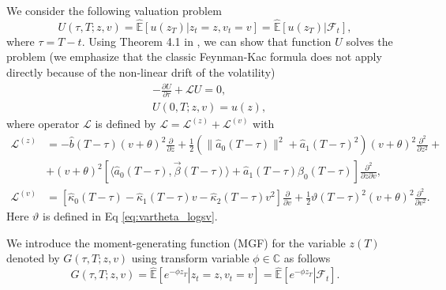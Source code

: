 \documentclass[pdftex,11pt,a4paper] {article}
\begin{document}
We consider the following valuation problem 
\begin{equation}\label{eq:val_gen}
U(\tau,T;z,v)=\mathbb{\hat E}\left[\left.u(z_T)\right|z_t=z,v_t=v\right]=
\mathbb{\hat E}\left[\left.u(z_T)\right|\mathcal{F}_t\right],
\end{equation}
where $\tau=T-t$. Using Theorem 4.1 in \cite{Sepp2024}, we can show that function $U$ solves the problem (we emphasize that the classic Feynman-Kac formula does not apply directly because of the non-linear drift of the volatility)
\begin{equation}\label{eq:pde1}
\begin{split}
&-\frac{\partial U}{\partial \tau}+\mathcal{L}U=0,\\
&U(0,T;z,v)=u(z),
\end{split}
\end{equation}
where operator $\mathcal{L}$ is defined by $\mathcal{L}=\mathcal{L}^{(z)}+\mathcal{L}^{(v)}$ with
\begin{equation}\label{eq:pde1_generator}
\begin{split}
\mathcal{L}^{(z)}&=-\hat b(T-\tau)(v+\theta)^2\frac{\partial }{\partial z}+\frac{1}{2}\left(\|\hat a_0(T-\tau)\|^2+\hat a_1(T-\tau)^2\right)(v+\theta)^2\frac{\partial^2 }{\partial z^2}+\\
&+(v+\theta)^2\left[\langle \hat a_0(T-\tau), \vec\beta(T-\tau)\rangle +\hat a_1(T-\tau)\beta_0(T-\tau)\right]\frac{\partial^2 }{\partial z\partial v},\\
\mathcal{L}^{(v)}&=\left[\hat\kappa_0(T-\tau)-\hat\kappa_1(T-\tau) v-\hat\kappa_2(T-\tau)v^2\right]\frac{\partial }{\partial v}+\frac{1}{2}\vartheta(T-\tau)^2(v+\theta)^2\frac{\partial^2 }{\partial v^2}.
\end{split}
\end{equation}
Here $\vartheta$ is defined in Eq \eqref{eq:vartheta_logsv}. 

We introduce the moment-generating function (MGF) for the variable $z(T)$ denoted by $G(\tau, T;z,v)$ using transform variable $\phi\in \mathbb{C}$ as follows
\begin{equation}\label{eq:mgf}
G(\tau,T;z,v)=\mathbb{\hat E}\left[\left.e^{-\phi z_T}\right|z_t=z,v_t=v\right]=
\mathbb{\hat E}\left[\left.e^{-\phi z_T}\right|\mathcal{F}_t\right].
\end{equation}
\end{document}

